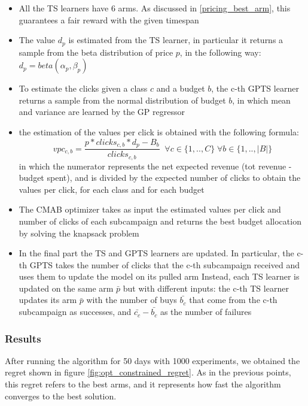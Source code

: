 \begin{itemize}
    \item All the TS learners have 6 arms. As discussed in \ref{pricing_best_arm}, this guarantees a fair reward with the given timespan
    \item The value $d_p$ is estimated from the TS learner, in particular it returns a sample from the beta distribution of price $p$, in the following way: $d_p = beta(\alpha_p, \beta_p)$
    \item To estimate the clicks given a class $c$ and a budget $b$, the c-th GPTS learner returns a sample from the normal distribution of budget $b$, in which mean and variance are learned by the GP regressor
    \item the estimation of the values per click is obtained with the following formula: 
    \[ vpc_{c,b} = \frac{p * clicks_{c,b} * d_p - B_b}{clicks_{c,b}} \;\; \forall c \in \{1,..,C\} \; \forall b \in \{1,..,|B|\} \]
    in which the numerator represents the net expected revenue (tot revenue - budget spent), and is divided by the expected number of clicks to obtain the values per click, for each class and for each budget
    \item The CMAB optimizer takes as input the estimated values per click and number of clicks of each subcampaign and returns the best budget allocation by solving the knapsack problem
    \item In the final part the TS and GPTS learners are updated. In particular, the c-th GPTS takes the number of clicks that the c-th subcampaign received and uses them to update the model on its pulled arm
    Instead, each TS learner is updated on the same arm $\bar{p}$ but with different inputs: the c-th TS learner updates its arm $\bar{p}$ with the number of buys $\bar{b_c}$ that come from the c-th subcampaign as successes, and $\bar{c_c} - \bar{b_c}$ as the number of failures
\end{itemize}

\subsubsection{Results}
After running the algorithm for 50 days with 1000 experiments, we obtained the regret shown in figure \ref{fig:opt_constrained_regret}.
As in the previous points, this regret refers to the best arms, and it represents how fast the algorithm converges to the best solution.

